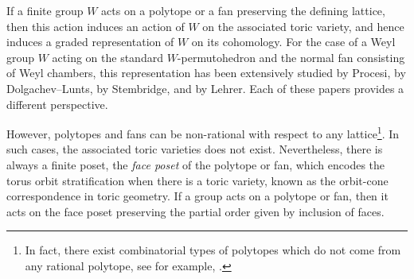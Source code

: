 \documentclass{amsart}
\theoremstyle{definition}
\theoremstyle{remark}
\numberwithin{equation}{section}
\begin{document}
If a finite group $W$ acts on a polytope or a fan preserving the defining lattice, then this action induces an action of $W$ on the associated toric variety, and hence induces a graded representation of $W$ on its cohomology. For the case of a Weyl group $W$ acting on the standard $W$-permutohedron and the normal fan consisting of Weyl chambers, this representation has been extensively studied by Procesi\cite{Procesi90}, by Dolgachev--Lunts\cite{dolgachev1994character}, by Stembridge\cite{stembridge1994some}, and by Lehrer\cite{lehrer2008rational}. Each of these papers provides a different perspective.

However, polytopes and fans can be non-rational with respect to any lattice\footnote{In fact, there exist combinatorial types of polytopes which do not come from any rational polytope, see for example, \cite{ziegler2008nonrational}.}. In such cases, the associated toric varieties does not exist. Nevertheless, there is always a finite poset, the \emph{face poset} of the polytope or fan, which encodes the torus orbit stratification when there is a toric variety, known as the orbit-cone correspondence in toric geometry\cite[Theorem 3.2.6]{cox2024toric}. If a group acts on a polytope or fan, then it acts on the face poset preserving the partial order given by inclusion of faces.
\end{document}
